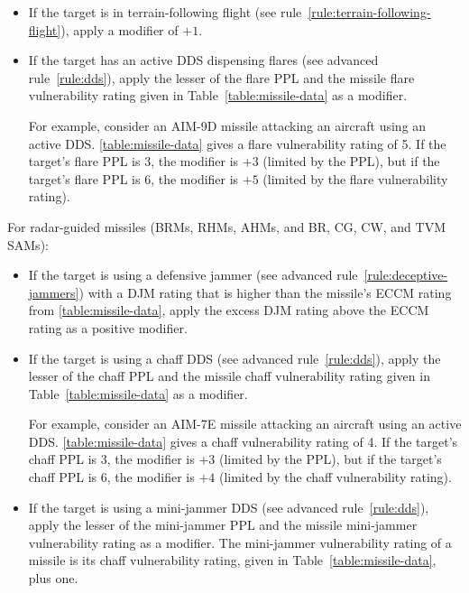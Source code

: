 {\begin{itemize}
    A target is in infrared ground clutter if it is in the LO altitude band (altitude levels 0 to 7) and two or more levels below the missile’s altitude at the start of the proportional move in which the missile attacks.

    \item If the target is in terrain-following flight (see rule~\ref{rule:terrain-following-flight}), apply a modifier of $+1$.

    \item If the target has an active DDS dispensing flares (see advanced rule~\ref{rule:dds}), apply the lesser of the flare PPL and the missile flare vulnerability rating given in Table~\ref{table:missile-data} as a modifier. 
    
    For example, consider an AIM-9D missile attacking an aircraft using an active DDS. \ref{table:missile-data} gives a flare vulnerability rating of 5. If the target’s flare PPL is 3, the modifier is $+3$ (limited by the PPL), but if the target’s flare PPL is 6, the modifier is $+5$ (limited by the flare vulnerability rating).
\end{itemize}

For radar-guided missiles (BRMs, RHMs, AHMs, and BR, CG, CW, and TVM SAMs):
\begin{itemize}
    \item If the target is using a defensive jammer (see advanced rule~\ref{rule:deceptive-jammers}) with a DJM rating that is higher than the missile’s ECCM rating from \ref{table:missile-data}, apply the excess DJM rating above the ECCM rating as a positive modifier.

    \item If the target is using a chaff DDS (see advanced rule~\ref{rule:dds}), apply the lesser of the chaff PPL and the missile chaff vulnerability rating given in Table~\ref{table:missile-data} as a modifier.

    For example, consider an AIM-7E missile attacking an aircraft using an active DDS. \ref{table:missile-data} gives a chaff vulnerability rating of 4. If the target’s chaff PPL is 3, the modifier is $+3$ (limited by the PPL), but if the target’s chaff PPL is 6, the modifier is $+4$ (limited by the chaff vulnerability rating).

    \item If the target is using a mini-jammer DDS (see advanced rule~\ref{rule:dds}), apply the lesser of the mini-jammer PPL and the missile mini-jammer vulnerability rating as a modifier. The mini-jammer vulnerability rating of a missile is its chaff vulnerability rating, given in Table~\ref{table:missile-data}, plus one.


\end{itemize}}
